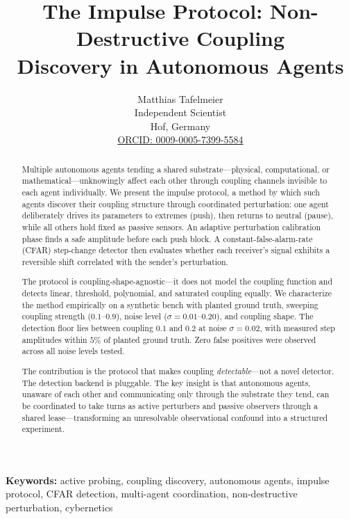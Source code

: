 \documentclass[11pt,a4paper]{article}
\title{The Impulse Protocol: Non-Destructive Coupling \\
       Discovery in Autonomous Agents}
\author{
  Matthias Tafelmeier \\
  Independent Scientist \\
  Hof, Germany \\
  \href{https://orcid.org/0009-0005-7399-5584}{ORCID: 0009-0005-7399-5584}
}
\date{}
\begin{document}
\maketitle

\begin{abstract}
Multiple autonomous agents tending a shared substrate---physical,
computational, or mathematical---unknowingly affect each other through coupling channels
invisible to each agent individually. We present the impulse protocol,
a method by which
such agents discover their coupling structure through coordinated
perturbation: one agent deliberately drives its parameters
to extremes (push), then returns to neutral (pause), while all others
hold fixed as passive sensors. An adaptive perturbation calibration
phase finds a safe amplitude before each push block. A
constant-false-alarm-rate (CFAR) step-change detector then evaluates
whether each receiver's signal exhibits a reversible shift
correlated with the sender's perturbation.

The protocol is coupling-shape-agnostic---it does not model the
coupling function and detects linear, threshold, polynomial, and
saturated coupling equally. We characterize the method empirically
on a synthetic bench with planted ground truth, sweeping coupling
strength ($0.1$--$0.9$), noise level ($\sigma = 0.01$--$0.20$), and
coupling shape. The detection floor lies between coupling $0.1$ and
$0.2$ at noise $\sigma = 0.02$, with measured step amplitudes within
$5\%$ of planted ground truth. Zero false positives were observed
across all noise levels tested.

The contribution is the protocol that makes coupling
\emph{detectable}---not a novel detector. The detection backend is
pluggable. The key insight is that autonomous agents, unaware of each
other and communicating only through the substrate they tend, can be
coordinated to take turns as active perturbers and passive observers
through a shared lease---transforming an unresolvable observational
confound into a structured experiment.
\end{abstract}

\noindent\textbf{Keywords:} active probing, coupling discovery, autonomous agents, impulse protocol, CFAR detection, multi-agent coordination, non-destructive perturbation, cybernetics











\end{document}
